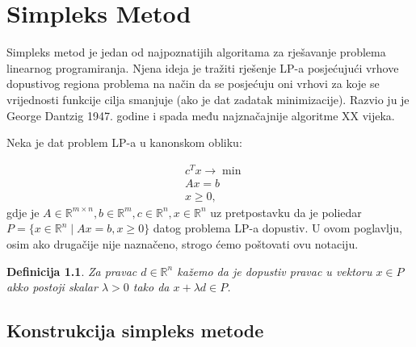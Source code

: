 \documentclass[a4paper, utf8, 11pt, colorlinks]{book}
\newtheorem{definition}{Definicija}
\begin{document}
\newpage 
\chapter{Simpleks Metod}

Simpleks metod je jedan od najpoznatijih algoritama za rješavanje problema linearnog programiranja. Njena ideja je tražiti rješenje LP-a posjećujući vrhove dopustivog regiona problema na način da se posjećuju oni vrhovi za koje se vrijednosti funkcije cilja smanjuje (ako je dat zadatak minimizacije). Razvio ju je George Dantzig 1947. godine i spada među najznačajnije algoritme XX vijeka.

Neka je dat problem LP-a u kanonskom obliku:

\begin{align}
    &c^Tx \rightarrow \min \nonumber \\ 
    & A x = b \nonumber \\
     & x \geq 0, \label{eq:lp_equality_constraint}
\end{align}
gdje je $A \in \mathbb{R}^{m \times n}, b \in \mathbb{R}^m, c \in \mathbb{R}^n, x\in \mathbb{R}^n$ uz pretpostavku da je poliedar $P=\{ x \in \mathbb{R}^n \mid A x = b , x \geq 0 \}$ datog problema LP-a dopustiv.  U ovom poglavlju, osim ako drugačije nije naznačeno, strogo ćemo poštovati ovu notaciju. 


\begin{definition}
      Za pravac $d\in \mathbb{R}^n$ kažemo da je dopustiv pravac u vektoru $x \in P$ akko postoji skalar $\lambda > 0$ tako da $x + \lambda d \in P$.
\end{definition}

\section{Konstrukcija simpleks metode}
\end{document}
